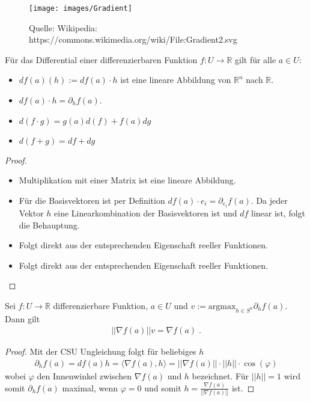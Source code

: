 \begin{figure}[H]
      \centering
    \texttt{[image: images/Gradient]}
      \caption{Quelle: Wikipedia: https://commons.wikimedia.org/wiki/File:Gradient2.svg}
\end{figure}


\begin{Bemerkung}
\label{partial1}
Für das Differential einer differenzierbaren Funktion  $f: U \to \mathbb{R}$ gilt für alle $a \in U$:
\begin{itemize}
\item  $df(a) (h) :=  df(a) \cdot h$ ist eine lineare Abbildung von $\mathbb{R}^n$ nach $\mathbb{R}$.
\item $df(a)  \cdot h = \partial_h f(a)$. 
\item $d (f \cdot g) = g(a) d(f) + f(a) dg$
\item $d(f + g) = df + dg$
\end{itemize}
\end{Bemerkung}
\begin{proof}
\begin{itemize}
\item  Multiplikation mit einer Matrix ist eine lineare Abbildung.
\item Für die Basisvektoren ist per Definition $df(a)  \cdot e_i = \partial_{e_i} f(a)$. Da jeder Vektor $h$ eine Linearkombination der Basisvektoren ist und $df$ linear ist, folgt die Behauptung.
\item Folgt direkt aus der entsprechenden Eigenschaft reeller Funktionen.
\item Folgt direkt aus der entsprechenden Eigenschaft reeller Funktionen.
\end{itemize}
\end{proof}


\begin{Satz}
Sei   $f: U \to \mathbb{R}$ differenzierbare Funktion,  $a \in U$ und $v := \text{argmax}_{ h \in S^n} \partial_h f(a) $.
Dann gilt 
\begin{align*}
|| \nabla f(a) || v =  \nabla f(a) \; .
\end{align*} 
\end{Satz}
\begin{proof}
Mit der CSU Ungleichung folgt für beliebiges $h$ 
\begin{align*}
\partial_h f(a) = df(a) h = \langle \nabla f(a) , h \rangle = || \nabla f(a)||  \cdot ||h|| \cdot \cos(\varphi) 
\end{align*} 
wobei $\varphi$ den Innenwinkel zwischen $\nabla f(a)$ und $h$ bezeichnet. Für $||h|| = 1$ wird somit $\partial_h f(a) $ maximal, wenn $\varphi = 0$ und somit $h =  \frac{\nabla f(a)}{||\nabla f(a)||}$ ist.
\end{proof}






